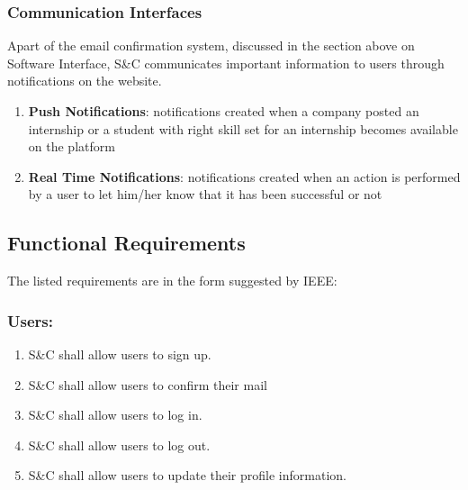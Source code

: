 \subsubsection{Communication Interfaces}
Apart of the email confirmation system, discussed in the section above on Software Interface, S\&C communicates important information to users through notifications on the website.
\begin{enumerate}
    \item  \textbf{Push Notifications}: notifications created when a company posted an internship or a student with right skill set for an internship becomes available on the platform
    \item \textbf{Real Time Notifications}: notifications created when an action is performed by a user to let him/her know that it has been successful or not
\end{enumerate}

\subsection{Functional Requirements}
    The listed requirements are in the form suggested by IEEE\cite{502838}: 
    \newline
    \subsubsection*{Users:}
        \begin{enumerate}[label=\textbf{R\arabic*}]
            \item S\&C shall allow users to sign up.                    %
            \item S\&C shall allow users to confirm their mail          %
            \item S\&C shall allow users to log in.                     %
            \item S\&C shall allow users to log out.                    %
            \item S\&C shall allow users to update their profile information.       %
                       
        \end{enumerate}
        
